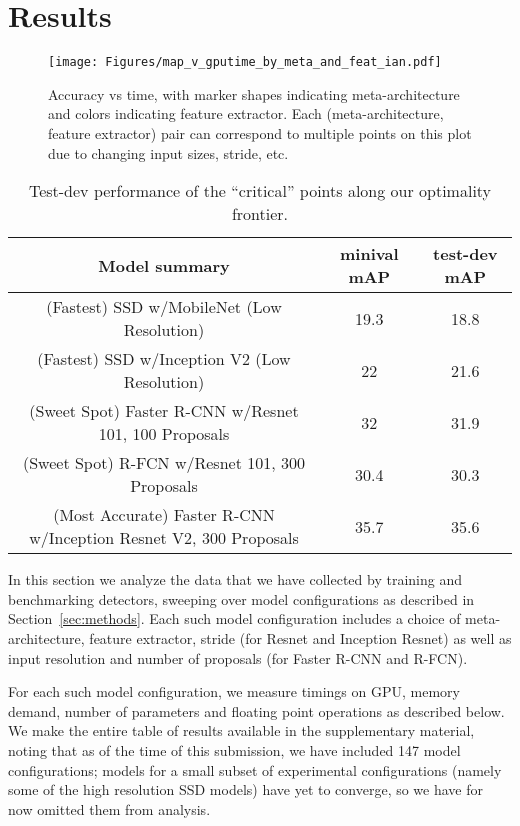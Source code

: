 \documentclass[10pt,twocolumn,letterpaper]{article}
\begin{document}
  \section{Results}
\label{sec:results}

\begin{figure*}[t!]
\begin{center}
\texttt{[image: Figures/map\_v\_gputime\_by\_meta\_and\_feat\_ian.pdf]}
\caption{
  \footnotesize
Accuracy vs time,
  with marker shapes indicating 
   meta-architecture
  and colors indicating  feature extractor. 
Each (meta-architecture, feature extractor) pair can correspond to multiple points on this plot due to changing input sizes, stride, etc.
}
\label{fig:map_v_gputime_by_meta_and_feat}
\end{center}
\end{figure*}


\begin{table*}[t!]
\begin{center}\footnotesize
\begin{tabular}{c|c|c}
\bf Model summary & \bf minival mAP & \bf test-dev mAP \\
\hline
(Fastest) SSD w/MobileNet (Low Resolution) & 19.3 & 18.8 \\
(Fastest) SSD w/Inception V2 (Low Resolution) & 22 & 21.6 \\
(Sweet Spot) Faster R-CNN w/Resnet 101, 100 Proposals & 32 & 31.9 \\
(Sweet Spot) R-FCN w/Resnet 101, 300 Proposals & 30.4 & 30.3 \\
(Most Accurate) Faster R-CNN w/Inception Resnet V2, 300 Proposals & 35.7 & 35.6\vspace{-3mm}
\end{tabular}
\caption{\footnotesize Test-dev performance of the ``critical'' points along our optimality frontier.}\vspace{-4mm}
\label{tab:testdev}
\end{center}
\end{table*}


In this section we analyze the data that we have collected by training and benchmarking detectors, sweeping over model configurations as described in Section~\ref{sec:methods}.  Each such model configuration includes a choice of meta-architecture, feature extractor, stride (for Resnet and Inception Resnet) as well as input resolution and number of proposals (for Faster R-CNN and R-FCN).


For each such model configuration, we measure timings on GPU, memory demand, number of parameters and floating point operations as described below.  We make the entire table of results available in the supplementary material, noting that as of the time of this submission, we have included 147 model configurations; models for a small subset of experimental configurations (namely some of the high resolution SSD models) 
have yet to converge, so we have for now omitted them from analysis.
\end{document}
